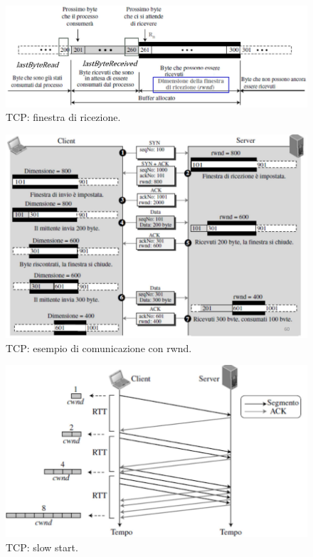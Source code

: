 \documentclass[11pt, italian, openany]{book}
\begin{document}
\begin{sloppypar}
\begin{figure}[!h]
	\centering
	\includegraphics[scale=0.5]{images/tcp-finestra-di-ricezione.png}
	\caption{TCP: finestra di ricezione.}
	\label{fig:tcp-finestra-di-ricezione}
\end{figure}

\pagebreak

\begin{figure}[!h]
	\centering
	\includegraphics[scale=0.35]{images/tcp-rwnd.png}
	\caption{TCP: esempio di comunicazione con rwnd.}
	\label{fig:tcp-rwnd}
\end{figure}


\begin{figure}[!h]
	\centering
	\includegraphics[scale=0.3]{images/tcp-slow-start.png}
	\caption{TCP: slow start.}
	\label{fig:tcp-slow-start}
\end{figure}



\end{sloppypar}
\end{document}
